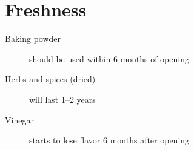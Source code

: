 
\section{Freshness}

\begin{description}
\item[Baking powder] should be used within 6 months of opening
\item[Herbs and spices (dried)] will last 1--2 years
\item[Vinegar] starts to lose flavor 6 months after opening
\end{description}

